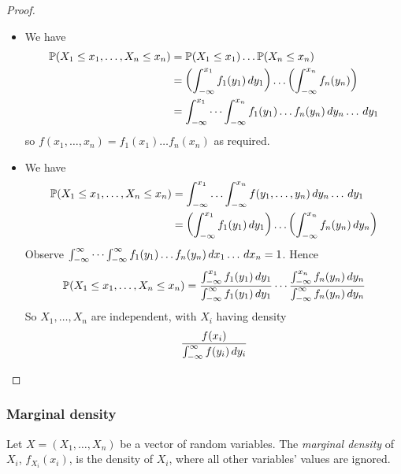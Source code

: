 \documentclass{../template/note}
\begin{document}
    \begin{proof}
        \begin{itemize}
            \item We have
            \begin{align*}
                \mathbb P(X_1 \leq x_1, \dots, X_n \leq x_n) &= \mathbb P(X_1 \leq x_1) \dots \mathbb P(X_n \leq x_n) \\
                &= \left(\int_{-\infty}^{x_1} f_1(y_1) \,d{y}_1\right) \dots \left(\int_{-\infty}^{x_n}f_n(y_n)\right) \\
                &= \int_{-\infty}^{x_1} \cdots \int_{-\infty}^{x_n} f_1(y_1) \dots f_n(y_n) \,d{y}_n \dots \,d{y}_1
            \end{align*}
            so \(f(x_1, \dots, x_n) = f_1(x_1) \dots f_n(x_n)\) as required.         
            
            \item We have
            \begin{align*}
                \mathbb P(X_1 \leq x_1, \dots, X_n \leq x_n) &= \int_{-\infty}^{x_1} \dots \int_{-\infty}^{x_n} f(y_1, \dots, y_n) \,d{y}_n \dots \,d{y}_1 \\
                &= \left(\int_{-\infty}^{x_1} f_1(y_1) \,d{y}_1\right) \dots \left(\int_{-\infty}^{x_n} f_n(y_n) \,d{y}_n\right)
            \end{align*}
            Observe \(\int_{-\infty}^\infty \cdots \int_{-\infty}^\infty f_1(y_1) \dots f_n(y_n) \,d{x}_1 \dots \,d{x}_n = 1\). Hence
            \begin{align*}
                \mathbb P(X_1 \leq x_1, \dots, X_n \leq x_n) = \frac{\int_{-\infty}^{x_1} f_1(y_1) \,d{y}_1}{\int_{-\infty}^\infty f_1(y_1) \,d{y}_1} \cdots \frac{\int_{-\infty}^{x_n} f_n(y_n) \,d{y}_n}{\int_{-\infty}^\infty f_n(y_n) \,d{y}_n}
            \end{align*}
            So \(X_1, \dots, X_n\) are independent, with \(X_i\) having density
            \begin{align*}
                \frac{f(x_i)}{\int_{-\infty}^\infty f(y_i) \,d{y}_i}
            \end{align*}
        \end{itemize}
    \end{proof}
    
    \subsubsection{Marginal density}

    \begin{definition}
        Let \(X = (X_1, \dots, X_n)\) be a vector of random variables. The \emph{marginal density} of \(X_i\), \(f_{X_i}(x_i)\), is the density of \(X_i\), where all other variables' values are ignored.
    \end{definition}
    
\end{document}
